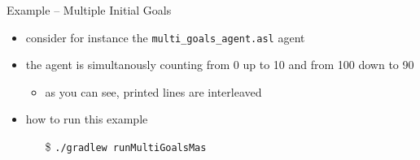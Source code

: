 \documentclass[presentation]{beamer}\mode<presentation>{\usetheme{AMSBolognaFC}}
\begin{document}
\begin{frame}[c, allowframebreaks]{Example \theJasonExample{} -- Multiple Initial Goals}
\begin{itemize}
        \item consider for instance the \texttt{multi\_goals\_agent.asl} agent
        
        
        \vspace{.3cm}
        
        \item the agent is \alert{simultanously} counting from 0 up to 10 and from 100 down to 90
        \begin{itemize}
            \item as you can see, printed lines are interleaved
        \end{itemize}
        
        \vspace{.3cm}
        
        \item how to run this example
        \begin{itemize}
            \item[\$] \texttt{./gradlew run\alert{MultiGoals}Mas}
        \end{itemize}
        
    \end{itemize}
\end{frame}
\end{document}

